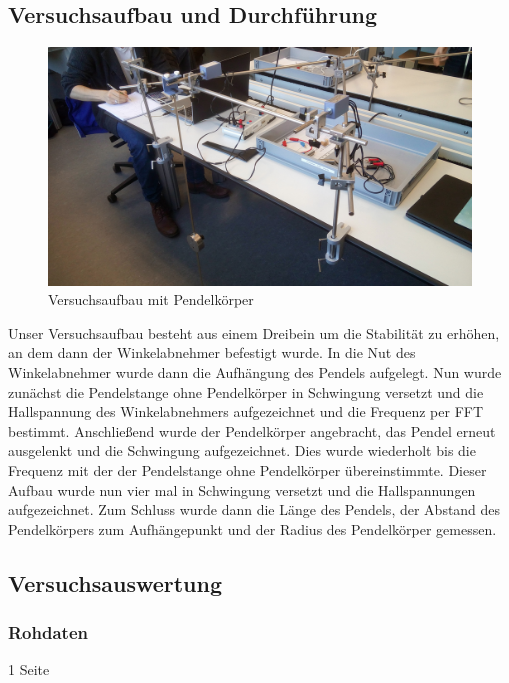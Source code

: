 \documentclass[12pt,a4paper]{article}
\begin{document}
\subsection{Versuchsaufbau und Durchführung}
\begin{figure}[H]
\centering
\includegraphics[scale=0.1]{Bilder/Einzelpendel.jpg}
\caption{Versuchsaufbau mit Pendelkörper}
\end{figure}
Unser Versuchsaufbau besteht aus einem Dreibein um die Stabilität zu erhöhen, an dem dann der Winkelabnehmer befestigt wurde. In die Nut des Winkelabnehmer wurde dann die Aufhängung des Pendels aufgelegt.
Nun wurde zunächst die Pendelstange ohne Pendelkörper in Schwingung versetzt und die Hallspannung des Winkelabnehmers aufgezeichnet und die Frequenz per FFT bestimmt.
Anschließend wurde der Pendelkörper angebracht, das Pendel erneut ausgelenkt und die Schwingung aufgezeichnet. Dies wurde wiederholt bis die Frequenz mit der der Pendelstange ohne Pendelkörper übereinstimmte.
Dieser Aufbau wurde nun vier mal in Schwingung versetzt und die Hallspannungen aufgezeichnet.
Zum Schluss wurde dann die Länge des Pendels, der Abstand des Pendelkörpers zum Aufhängepunkt und der Radius des Pendelkörper gemessen.
\newpage
\subsection{Versuchsauswertung}

\subsubsection{Rohdaten}
1 Seite
\end{document}
